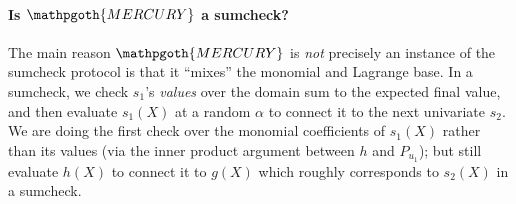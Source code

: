 \documentclass[11pt]{article} %
\newcommand{\mercury}{\ensuremath{\mathpgoth{MERCURY} }\xspace}
\begin{document}
\paragraph{Is \mercury a sumcheck?}
The main reason \mercury is \emph{not} precisely an instance of the sumcheck protocol is that it ``mixes'' the monomial and Lagrange base.
In a sumcheck, we check $s_1$'s \emph{values} over the domain sum to the expected final value, and then evaluate $s_1(X)$ at a random $\alpha$ to connect it to the next univariate $s_2$.  We are doing the first check over the monomial coefficients of $s_1(X)$ rather than its values (via the inner product argument between $h$ and $P_{u_1}$); but still  evaluate $h(X)$ to connect it to $g(X)$ which roughly corresponds to $s_2(X)$ in a sumcheck. 
\end{document}
